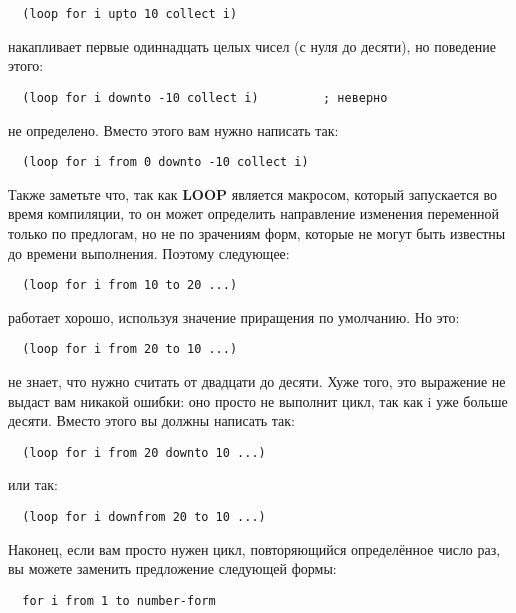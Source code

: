 \begin{lstlisting}
  (loop for i upto 10 collect i)
\end{lstlisting}

накапливает первые одиннадцать целых чисел (с нуля до десяти), но поведение этого:

\begin{lstlisting}
  (loop for i downto -10 collect i)         ; неверно
\end{lstlisting}

не определено. Вместо этого вам нужно написать так:

\begin{lstlisting}
  (loop for i from 0 downto -10 collect i)
\end{lstlisting}

Также заметьте что, так как \textbf{LOOP} является макросом, который запускается во время
компиляции, то он может определить направление изменения переменной только по предлогам,
но не по зрачениям форм, которые не могут быть известны до времени выполнения. Поэтому
следующее:

\begin{lstlisting}
  (loop for i from 10 to 20 ...) 
\end{lstlisting}

работает хорошо, используя значение приращения по умолчанию. Но это:

\begin{lstlisting}
  (loop for i from 20 to 10 ...)
\end{lstlisting}

не знает, что нужно считать от двадцати до десяти. Хуже того, это выражение не выдаст вам
никакой ошибки: оно просто не выполнит цикл, так как i уже больше десяти. Вместо этого вы
должны написать так:

\begin{lstlisting}
  (loop for i from 20 downto 10 ...)
\end{lstlisting}

или так:

\begin{lstlisting}
  (loop for i downfrom 20 to 10 ...)
\end{lstlisting}

Наконец, если вам просто нужен цикл, повторяющийся определённое число раз, вы можете
заменить предложение следующей формы:

\begin{lstlisting}
  for i from 1 to number-form
\end{lstlisting}

